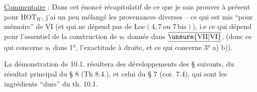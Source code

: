 
\uline{Commentaire} : Dans cet énoncé récapitulatif de ce
que je sais prouver à présent pour $\mathrm{HOT}_{W}$, j'ai
un peu mélangé les provenances diverses --
ce qui est mis ``pour mémoire'' de $\overline{\underline{\mathrm{VI}}}$
(et qui ne dépend pas de $\mathrm{Loc}(4,7\ \text{ou }7\,\mathrm{bis})$),
i.e ce qui dépend pour l'essentiel de la
construction de $u_!$ donnée dans $\overline{\underline{\unsure{\mathrm{VII}|\mathrm{VI}}}}$, 
(donc ce qui concerne $u_!$ dans 1°, \uline{}
l'exactitude à droite, et  ce qui concerne
3° a) b)).

La démonstration de 10.1. résultera des
développements des § suivants,   du
résultat principal du § 8 (Th 8.4.), et 
celui du § 7 (cor. 7.4), qui sont les
ingrédients ``durs'' du th. 10.1.
